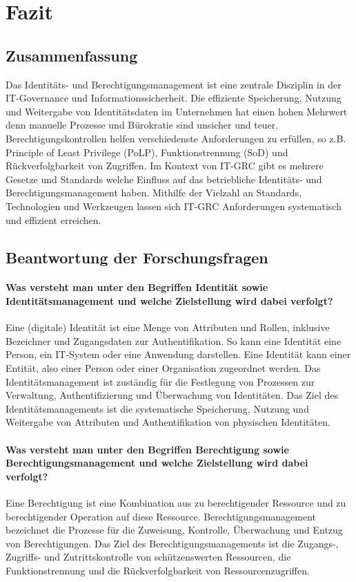 \documentclass[11pt]{article}
\begin{document}
\section{Fazit}
\subsection{Zusammenfassung}
Das Identitäts- und Berechtigungsmanagement ist eine zentrale Disziplin in der IT-Governance und Informationssicherheit. Die effiziente Speicherung, Nutzung und Weitergabe von Identitätsdaten im Unternehmen hat einen hohen Mehrwert denn manuelle Prozesse und Bürokratie sind unsicher und teuer. Berechtigungskontrollen helfen verschiedenste Anforderungen zu erfüllen, so z.B. Principle of Least Privilege (PoLP), Funktionstrennung (SoD) und Rückverfolgbarkeit von Zugriffen. Im Kontext von IT-GRC gibt es mehrere Gesetze und Standards welche Einfluss auf das betriebliche Identitäts- und Berechtigungsmanagement haben. Mithilfe der Vielzahl an Standards, Technologien und Werkzeugen lassen sich IT-GRC Anforderungen systematisch und effizient erreichen.
\subsection{Beantwortung der Forschungsfragen}
\paragraph{Was versteht man unter den Begriffen \glqq{}Identität\grqq{} sowie \glqq{}Identitätsmanagement\grqq{} und welche Zielstellung wird dabei verfolgt?}
Eine (digitale) Identität ist eine Menge von Attributen und Rollen, inklusive Bezeichner und Zugangsdaten zur Authentifikation. So kann eine Identität eine Person, ein IT-System oder eine Anwendung darstellen. Eine Identität kann einer Entität, also einer Person oder einer Organisation zugeordnet werden. Das Identitätsmanagement ist zuständig für die Festlegung von Prozessen zur Verwaltung, Authentifizierung und Überwachung von Identitäten. Das Ziel des Identitätsmanagements ist die systematische Speicherung, Nutzung und Weitergabe von Attributen und Authentifikation von physischen Identitäten.
\paragraph{Was versteht man unter den Begriffen \glqq{}Berechtigung\grqq{} sowie \glqq{}Berechtigungsmanagement\grqq{} und welche Zielstellung wird dabei verfolgt?}
Eine Berechtigung ist eine Kombination aus zu berechtigender Ressource und zu berechtigender Operation auf diese Ressource. Berechtigungsmanagement bezeichnet die Prozesse für die Zuweisung, Kontrolle, Überwachung und Entzug von Berechtigungen. Das Ziel des Berechtigungsmanagements ist die Zugangs-, Zugriffs- und Zutrittskontrolle von schützenswerten Ressourcen, die Funktionstrennung und die Rückverfolgbarkeit von Ressourcenzugriffen.
\end{document}

